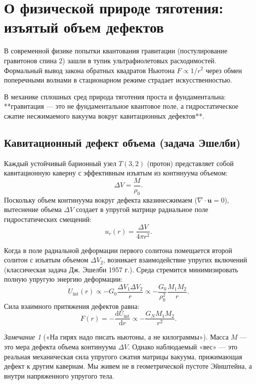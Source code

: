 \documentclass[11pt,a4paper]{article}
\theoremstyle{definition}
\theoremstyle{remark}
\newtheorem{remark}{Замечание}
\begin{document}
\section{О физической природе тяготения: изъятый объем дефектов}
В современной физике попытки квантования гравитации (постулирование гравитонов спина 2) зашли в тупик ультрафиолетовых расходимостей. Формальный вывод закона обратных квадратов Ньютона $F \propto 1/r^2$ через обмен поперечными волнами в стационарном режиме страдает искусственностью.

В механике сплошных сред природа тяготения проста и фундаментальна: **гравитация — это не фундаментальное квантовое поле, а гидростатическое сжатие несжимаемого вакуума вокруг кавитационных дефектов**.

\subsection{Кавитационный дефект объема (задача Эшелби)}
Каждый устойчивый барионный узел $T(3,2)$ (протон) представляет собой кавитационную каверну с эффективным изъятым из континуума объемом:
\begin{equation}
    \Delta V = \frac{M}{\rho_0}.
\end{equation}
Поскольку объем континуума вокруг дефекта квазинесжимаем ($\nabla \cdot \mathbf{u} = 0$), вытеснение объема $\Delta V$ создает в упругой матрице радиальное поле гидростатических смещений:
\begin{equation}
    u_r(r) = \frac{\Delta V}{4\pi r^2}.
\end{equation}

Когда в поле радиальной деформации первого солитона помещается второй солитон с изъятым объемом $\Delta V_2$, возникает взаимодействие упругих включений (классическая задача Дж. Эшелби 1957 г.). Среда стремится минимизировать полную упругую энергию деформации:
\begin{equation}
    U_{\mathrm{int}}(r) \propto -G_0 \frac{\Delta V_1 \Delta V_2}{r} \propto -\frac{G_0}{\rho_0^2} \frac{M_1 M_2}{r}.
\end{equation}
Сила взаимного притяжения дефектов равна:
\begin{equation}
    F(r) = -\frac{\mathrm{d}U_{\mathrm{int}}}{\mathrm{d}r} \propto -\frac{G_N M_1 M_2}{r^2}.
\end{equation}

\begin{remark}[«На гирях надо писать ньютоны, а не килограммы»]
Масса $M$ — это мера дефекта объема континуума $\Delta V$. Однако наблюдаемый «вес» — это реальная механическая сила упругого сжатия матрицы вакуума, прижимающая дефект к другим кавернам. Мы живем не в геометрической пустоте Эйнштейна, а внутри напряженного упругого тела.
\end{remark}
\end{document}
